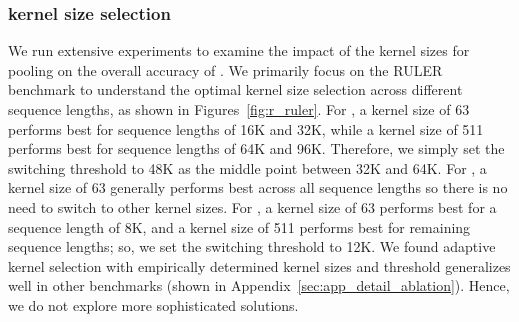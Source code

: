 \subsubsection{\rocketkv kernel size selection}

We run extensive experiments to examine the impact of the kernel sizes for pooling on the overall accuracy of \rocketkv. We primarily focus on the RULER benchmark to understand the optimal kernel size selection across different sequence lengths, as shown in Figures~\ref{fig:r_ruler}. For \llama, a kernel size of 63 performs best for sequence lengths of 16K and 32K, while a kernel size of 511 performs best for sequence lengths of 64K and 96K. Therefore, we simply set the switching threshold to 48K as the middle point between 32K and 64K. For \mistral, a kernel size of 63 generally performs best across all sequence lengths so there is no need to switch to other kernel sizes. For \longchat, a kernel size of 63 performs best for a sequence length of 8K, and a kernel size of 511 performs best for remaining sequence lengths; so, we set the switching threshold to 12K. We found adaptive kernel selection with empirically determined kernel sizes and threshold generalizes well in other benchmarks (shown in Appendix~\ref{sec:app_detail_ablation}). Hence, we do not explore more sophisticated solutions.


















